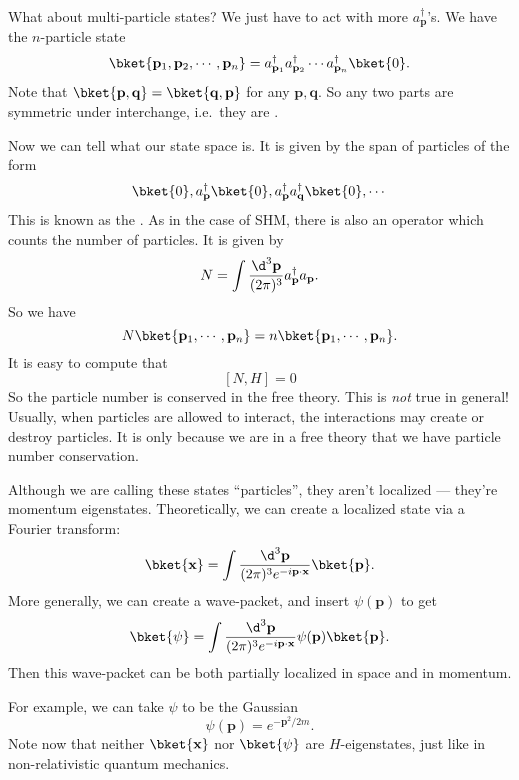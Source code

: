 \documentclass[a4paper]{article}
\begin{document}

What about multi-particle states? We just have to act with more $a_\mathbf{p}^\dagger$'s. We have the $n$-particle state
\[
  \bket{\mathbf{p}_1, \mathbf{p}_2, \cdots, \mathbf{p}_n} = a_{\mathbf{p}_1}^\dagger a_{\mathbf{p}_2}^\dagger \cdots a_{\mathbf{p}_n}^\dagger \bket{0}.
\]
Note that $\bket{\mathbf{p}, \mathbf{q}} = \bket{\mathbf{q}, \mathbf{p}}$ for any $\mathbf{p}, \mathbf{q}$. So any two parts are symmetric under interchange, i.e.\ they are .

Now we can tell what our state space is. It is given by the span of particles of the form
\[
  \bket{0}, a_\mathbf{p}^\dagger \bket{0}, a_\mathbf{p}^\dagger a_\mathbf{q}^{\dagger}\bket{0}, \cdots
\]
This is known as the . As in the case of SHM, there is also an operator which counts the number of particles. It is given by
\[
  N = \int \frac{\d^3 \mathbf{p}}{(2\pi)^3} a_\mathbf{p}^\dagger a_\mathbf{p}.
\]
So we have
\[
  N\bket{\mathbf{p}_1, \cdots, \mathbf{p}_n} = n\bket{\mathbf{p}_1, \cdots, \mathbf{p}_n}.
\]
It is easy to compute that
\[
  [N, H] = 0
\]
So the particle number is conserved in the free theory. This is \emph{not} true in general! Usually, when particles are allowed to interact, the interactions may create or destroy particles. It is only because we are in a free theory that we have particle number conservation.

Although we are calling these states ``particles'', they aren't localized --- they're momentum eigenstates. Theoretically, we can create a localized state via a Fourier transform:
\[
  \bket{\mathbf{x}} = \int\frac{\d^3 \mathbf{p}}{(2\pi)^3 e^{-i\mathbf{p}\cdot \mathbf{x}}}\bket{\mathbf{p}}.
\]
More generally, we can create a wave-packet, and insert $\psi(\mathbf{p})$ to get
\[
  \bket{\psi} = \int\frac{\d^3 \mathbf{p}}{(2\pi)^3 e^{-i\mathbf{p}\cdot \mathbf{x}}}\psi(\mathbf{p})\bket{\mathbf{p}}.
\]
Then this wave-packet can be both partially localized in space and in momentum.

For example, we can take $\psi$ to be the Gaussian
\[
  \psi(\mathbf{p}) = e^{-\mathbf{p}^2/2m}.
\]
Note now that neither $\bket{\mathbf{x}}$ nor $\bket{\psi}$ are $H$-eigenstates, just like in non-relativistic quantum mechanics.
\end{document}
